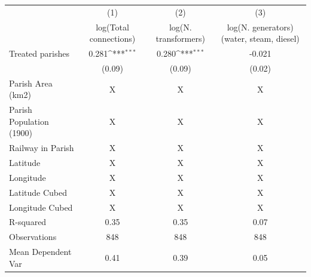 {
\def\sym#1{\ifmmode^{#1}\else\(^{#1}\)\fi}
\begin{tabular}{l*{3}{c}}
\hline\hline
                    &\multicolumn{1}{c}{(1)}         &\multicolumn{1}{c}{(2)}         &\multicolumn{1}{c}{(3)}         \\
                    &log(Total connections)         &log(N. transformers)         &log(N. generators) (water, steam, diesel)         \\
\hline
Treated parishes    &       0.281\sym{***}&       0.280\sym{***}&      -0.021         \\
                    &      (0.09)         &      (0.09)         &      (0.02)         \\
\hline
Parish Area (km2)   &           X         &           X         &           X         \\
Parish Population (1900)&           X         &           X         &           X         \\
Railway in Parish   &           X         &           X         &           X         \\
Latitude            &           X         &           X         &           X         \\
Longitude           &           X         &           X         &           X         \\
Latitude Cubed      &           X         &           X         &           X         \\
Longitude Cubed     &           X         &           X         &           X         \\
R-squared           &        0.35         &        0.35         &        0.07         \\
Observations        &         848         &         848         &         848         \\
Mean Dependent Var  &        0.41         &        0.39         &        0.05         \\
\hline\hline
\end{tabular}
}
